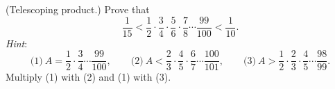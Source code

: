 (Telescoping product.) Prove that
\[ \frac{1}{15} < \frac{1}{2} \cdot \frac{3}{4} \cdot \frac{5}{6} \cdot \frac{7}{8} \cdots \frac{99}{100} < \frac{1}{10}. \]
\emph{Hint}:
\[ \text{(1)}\ A = \frac{1}{2} \cdot \frac{3}{4} \cdots \frac{99}{100},\qquad \text{(2)}\ A < \frac{2}{3} \cdot \frac{4}{5} \cdot \frac{6}{7} \cdots \frac{100}{101},\qquad \text{(3)}\ A > \frac{1}{2} \cdot \frac{2}{3} \cdot \frac{4}{5} \cdots \frac{98}{99}. \]
Multiply (1) with (2) and (1) with (3).
